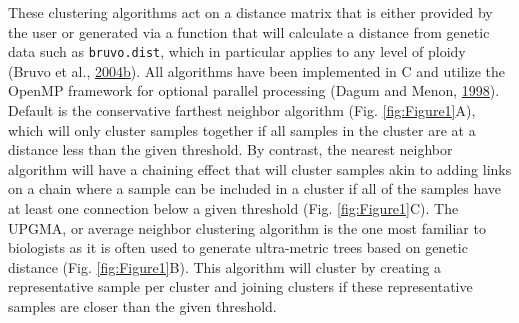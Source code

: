 \documentclass[double,12pt]{beavtex}
\begin{document}
  These clustering algorithms act on a distance matrix that is either
  provided by the user or generated via a function that will calculate a
  distance from genetic data such as \texttt{bruvo.dist}, which in
  particular applies to any level of ploidy (Bruvo et al.,
  \protect\hyperlink{ref-bruvo2004simple}{2004}\protect\hyperlink{ref-bruvo2004simple}{b}).
  All algorithms have been implemented in C and utilize the OpenMP
  framework for optional parallel processing (Dagum and Menon,
  \protect\hyperlink{ref-dagum1998openmp}{1998}). Default is the
  conservative farthest neighbor algorithm (Fig. \ref{fig:Figure1}A),
  which will only cluster samples together if all samples in the cluster
  are at a distance less than the given threshold. By contrast, the
  nearest neighbor algorithm will have a chaining effect that will cluster
  samples akin to adding links on a chain where a sample can be included
  in a cluster if all of the samples have at least one connection below a
  given threshold (Fig. \ref{fig:Figure1}C). The UPGMA, or average
  neighbor clustering algorithm is the one most familiar to biologists as
  it is often used to generate ultra-metric trees based on genetic
  distance (Fig. \ref{fig:Figure1}B). This algorithm will cluster by
  creating a representative sample per cluster and joining clusters if
  these representative samples are closer than the given threshold.
  
\end{document}

